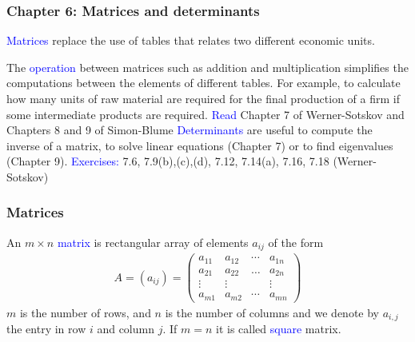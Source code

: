 \documentclass[11pt,aspectratio=169]{beamer}
\begin{document}
\begin{frame}
\frametitle{Chapter 6: Matrices and determinants}
\begin{small}
\textcolor{blue}{Matrices} replace the use of tables that relates two different economic units. 

\vskip 12pt
The \textcolor{blue}{operation} between matrices such as addition and multiplication simplifies the computations between the elements of different tables. 
\vskip 12pt
For example, to calculate how many units of raw material are required for the final production of a firm if some intermediate products are required.
\vskip 12pt
\textcolor{blue}{Read}  Chapter 7 of Werner-Sotskov and Chapters 8 and 9 of Simon-Blume
\vskip 12pt
\textcolor{blue}{Determinants} are useful to compute the inverse of a matrix, to solve linear equations (Chapter 7) or to find eigenvalues (Chapter 9).
\vskip 12pt
\textcolor{blue}{Exercises:} 7.6, 
7.9(b),(c),(d), 7.12, 7.14(a), 7.16, 7.18 (Werner-Sotskov)


\end{small}
\end{frame}

\begin{frame}
\frametitle{Matrices}
\begin{small}
An $m\times n$ \textcolor{blue}{matrix} is rectangular array of elements $a_{ij}$ of the form 
\begin{align*}A=(a_{ij})=\begin{pmatrix}a_{11} & a_{12} & \cdots & a_{1n}\\
a_{21} & a_{22} & \dots & a_{2n} \\
\vdots & \vdots &&\vdots \\
a_{m1}& a_{m2} &\cdots & a_{mn}
\end{pmatrix}
\end{align*}
$m$ is the number of rows, and $n$ is the number of columns and we denote by $a_{i,j}$ the entry in row $i$ and column $j$.
\vskip 12pt
If $m=n$ it is called \textcolor{blue}{square} matrix. 


\end{small}
\end{frame}
\end{document}

